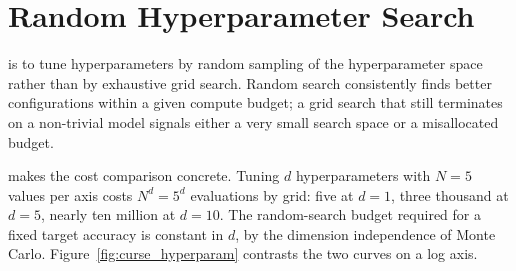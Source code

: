 



\newpage
\section{Random Hyperparameter Search}


 is to tune hyperparameters by random sampling of the hyperparameter space rather than by exhaustive grid search.
Random search consistently finds better configurations within a given compute budget;
a grid search that still terminates on a non-trivial model signals either a very small search space or a misallocated budget.

 makes the cost comparison concrete.
Tuning $d$ hyperparameters with $N = 5$ values per axis costs $N^d = 5^d$ evaluations by grid:
five at $d = 1$, three thousand at $d = 5$, nearly ten million at $d = 10$.
The random-search budget required for a fixed target accuracy is constant in $d$, by the dimension independence of Monte Carlo.
Figure~\ref{fig:curse_hyperparam} contrasts the two curves on a log axis.

